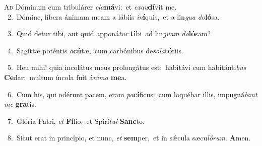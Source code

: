 \lettrine{\initial\textcolor{\initialcolor}{A}}{d} Dóminum cum tribulárer \textit{cla}\-\textbf{má}vi:~\star et \textit{ex}\-\textit{au}\textbf{dí}vit me.\\
{\numbfont\textcolor{\numbcolor}{~2.}}~Dómine, líbera ánimam meam a lábiis \textit{in}\-\textbf{í}quis,~\star et a lin\textit{gua} \textit{do}\-\textbf{ló}sa.\par
{\numbfont\textcolor{\numbcolor}{~3.}}~Quid detur tibi, aut quid apponá\textit{tur} \textbf{ti}\-bi~\star ad lin\textit{guam} \textit{do}\-\textbf{ló}sam?\par
{\numbfont\textcolor{\numbcolor}{~4.}}~Sagíttæ poténtis \textit{a}\-\textbf{cú}tæ,~\star cum carbónibus de\-\textit{so}\-\textit{la}\textbf{tó}riis.\par
{\numbfont\textcolor{\numbcolor}{~5.}}~Heu mihi! quia incolátus meus prolongátus est:~\dagger habitávi cum habitánti\textit{bus} \textbf{Ce}\-dar:~\star multum íncola fuit á\-\textit{ni}\-\textit{ma} \textbf{me}\-a.\par
{\numbfont\textcolor{\numbcolor}{~6.}}~Cum his, qui odérunt pacem, eram \textit{pa}\-\textbf{cí}ficus:~\star cum loquébar illis, impugná\textit{bant} \textit{me} \textbf{gra}\-tis.\par
{\numbfont\textcolor{\numbcolor}{~7.}}~Glória Patri, \textit{et} \textbf{Fí}\-lio,~\star et Spirí\-\textit{tu}\-\textit{i} \textbf{Sanc}\-to.\par
{\numbfont\textcolor{\numbcolor}{~8.}}~Sicut erat in princípio, et nunc, \textit{et} \textbf{sem}\-per,~\star et in sǽcula sæcu\-\textit{ló}\-\textit{rum}. \textbf{A}\-men.\par
